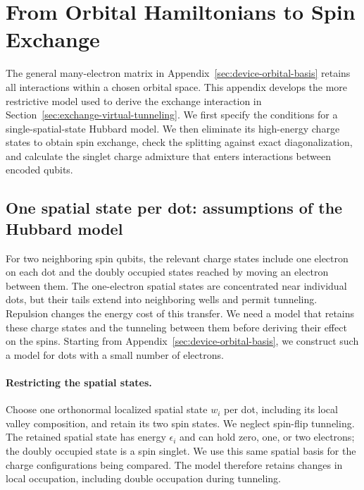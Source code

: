 \FloatBarrier
\section{From Orbital Hamiltonians to Spin Exchange}
\label{app:exchange-reduction}
\label{sec:effective-models-numerics}

The general many-electron matrix in
Appendix~\ref{sec:device-orbital-basis} retains all interactions within
a chosen orbital space. This appendix develops the more restrictive
model used to derive the exchange interaction in
Section~\ref{sec:exchange-virtual-tunneling}. We first specify the
conditions for a single-spatial-state Hubbard model. We then eliminate
its high-energy charge states to obtain spin exchange, check the
splitting against exact diagonalization, and calculate the singlet
charge admixture that enters interactions between encoded qubits.

\subsection{One spatial state per dot: assumptions of the Hubbard model}
\label{sec:device-hubbard-reduction}

For two neighboring spin qubits, the relevant charge states include
one electron on each dot and the doubly occupied states reached by
moving an electron between them. The one-electron spatial states are
concentrated near individual dots, but their tails extend into
neighboring wells and permit tunneling. Repulsion changes the energy
cost of this transfer. We need a model that retains these charge
states and the tunneling between them before deriving their effect
on the spins. Starting from Appendix~\ref{sec:device-orbital-basis},
we construct such a model for dots with a small number of electrons.

\paragraph{Restricting the spatial states.}
Choose one orthonormal localized spatial state $w_i$ per dot,
including its local valley composition, and retain its two spin
states. We neglect spin-flip tunneling. The retained spatial state
has energy $\epsilon_i$ and can hold zero, one, or two electrons;
the doubly occupied state is a spin singlet. We use this same spatial
basis for the charge configurations being compared. The model
therefore retains changes in local occupation, including double
occupation during tunneling.

